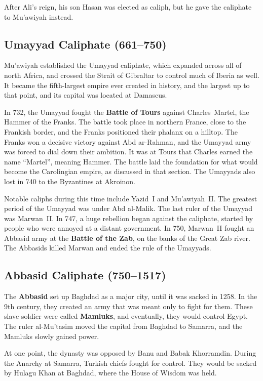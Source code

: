 After Ali's reign, his son Hasan was elected as caliph, but he gave the caliphate to Mu'awiyah instead.

\subsection*{Umayyad Caliphate (661--750)}

Mu'awiyah established the Umayyad caliphate, which expanded across all of north Africa,
and crossed the Strait of Gibraltar to control much of Iberia as well.
It became the fifth-largest empire ever created in history, and the largest up to that point,
and its capital was located at Damascus.

In 732, the Umayyad fought the \textbf{Battle of Tours} against Charles~Martel, the Hammer of the Franks.
The battle took place in northern France, close to the Frankish border,
and the Franks positioned their phalanx on a hilltop.
The Franks won a decisive victory against Abd ar-Rahman,
and the Umayyad army was forced to dial down their ambition.
It was at Tours that Charles earned the name ``Martel'', meaning Hammer.
The battle laid the foundation for what would become the Carolingian empire, as discussed in that section.
The Umayyads also lost in 740 to the Byzantines at Akroinon.

Notable caliphs during this time include Yazid~I and Mu'awiyah~II\@.
The greatest period of the Umayyad was under Abd al-Malik.
The last ruler of the Umayyad was Marwan~II\@.
In 747, a huge rebellion began against the caliphate, started by people who were annoyed at a distant government.
In 750, Marwan~II fought an Abbasid army at the \textbf{Battle of the Zab},
on the banks of the Great Zab river.
The Abbasids killed Marwan and ended the rule of the Umayyads.

\subsection*{Abbasid Caliphate (750--1517)}

The \textbf{Abbasid} set up Baghdad as a major city, until it was sacked in 1258.
In the 9th century, they created an army that was meant only to fight for them.
These slave soldier were called \textbf{Mamluks}, and eventually, they would control Egypt.
The ruler al-Mu'tasim moved the capital from Baghdad to Samarra, and the Mamluks slowly gained power.

At one point, the dynasty was opposed by Banu and Babak Khorramdin.
During the Anarchy at Samarra, Turkish chiefs fought for control.
They would be sacked by Hulagu Khan at Baghdad, where the House of Wisdom was held.

